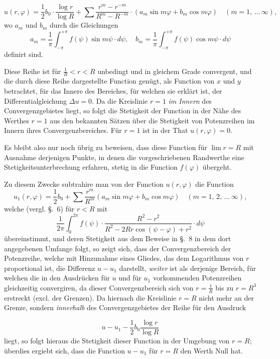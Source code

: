 \documentclass{article}
\begin{document}
\[
u(r, \varphi) = \frac{1}{2} b_0 \cdot \frac{\log r}{\log R} + \sum \frac{r^m - r^{-m}}{R^m - R^{-m}} \cdot (a_m \sin m\varphi + b_m \cos m\varphi) \quad (m = 1, \, \dots \, \infty),
\]
wo $a_m$ und $b_m$ durch die Gleichungen
\[
a_m = \frac{1}{\pi} \int_{-\pi}^{+\pi} f(\psi) \sin m\psi \cdot d\psi, \quad b_m = \frac{1}{\pi} \int_{-\pi}^{+\pi} f(\psi) \cos m\psi \cdot d\psi
\]
definirt sind.

Diese Reihe ist für $\frac{1}{R} < r < R$ unbedingt und in gleichem Grade convergent, und die durch diese Reihe dargestellte Function genügt, als Function von $x$ und $y$ betrachtet, für das Innere des Bereiches, für welchen sie erklärt ist, der Differentialgleichung $\Delta u = 0$. Da die Kreislinie $r = 1$ \emph{im Innern} des Convergenzgebietes liegt, so folgt die Stetigkeit der Function in der Nähe des Werthes $r = 1$ aus den bekannten Sätzen über die Stetigkeit von Potenzreihen im Innern ihres Convergenzbereiches. Für $r = 1$ ist in der That $u(r, \varphi) = 0$.

Es bleibt also nur noch übrig zu beweisen, dass diese Function für $\lim r = R$ mit Ausnahme derjenigen Punkte, in denen die vorgeschriebenen Randwerthe eine Stetigkeitsunterbrechung erfahren, stetig in die Function $f(\varphi)$ übergeht.

Zu diesem Zwecke subtrahire man von der Function $u(r, \varphi)$ die Function
\[
u_1(r, \varphi) = \frac{1}{2} b_0 + \sum \frac{r^m}{R^m} (a_m \sin m\varphi + b_m \cos m\varphi) \quad (m = 1, \, 2, \, \dots \, \infty),
\]
welche (vergl. §.~6) für $r < R$ mit
\[
\frac{1}{2\pi} \int_0^{2\pi} f(\psi) \cdot \frac{R^2 - r^2}{R^2 - 2Rr \cos(\psi - \varphi) + r^2} \cdot d\psi
\]
übereinstimmt, und deren Stetigkeit aus dem Beweise in §.~8 in dem dort angegebenen Umfange folgt, so zeigt sich, dass der Convergenzbereich der Potenzreihe, welche mit Hinzunahme eines Gliedes, das dem Logarithmus von $r$ proportional ist, die Differenz $u - u_1$ darstellt, \emph{weiter} ist als derjenige Bereich, für welchen die in den Ausdrücken für $u$ und für $u_1$ vorkommenden Potenzreihen gleichzeitig convergiren, da dieser Convergenzbereich sich von $r = \frac{1}{R}$ bis zu $r = R^3$ erstreckt (excl. der Grenzen). Da hiernach die Kreislinie $r = R$ nicht mehr an der Grenze, sondern \emph{innerhalb} des Convergenzgebietes der Reihe für den Ausdruck

\[
u - u_1 - \frac{1}{2} b_0 \frac{\log r}{\log R}
\]
liegt, so folgt hieraus die Stetigkeit dieser Function in der Umgebung von $r = R$; überdies ergiebt sich, dass die Function $u - u_1$ für $r = R$ den Werth Null hat.
\end{document}
